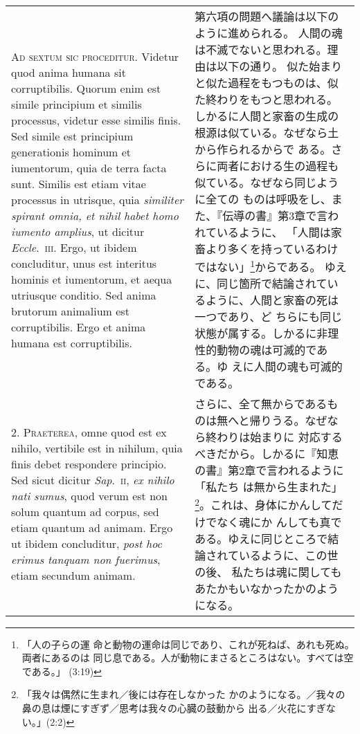 \documentclass[10pt]{jsarticle} %
\begin{document}
\begin{longtable}{p{21em}p{21em}}

{\scshape Ad sextum sic proceditur}. Videtur quod anima humana sit
corruptibilis. Quorum enim est simile principium et similis processus,
videtur esse similis finis. Sed simile est principium generationis
hominum et iumentorum, quia de terra facta sunt. Similis est etiam
vitae processus in utrisque, quia {\itshape similiter spirant omnia, et nihil
habet homo iumento amplius}, ut dicitur {\itshape Eccle}.~{\scshape iii}. Ergo, ut ibidem
concluditur, unus est interitus hominis et iumentorum, et aequa
utriusque conditio. Sed anima brutorum animalium est
corruptibilis. Ergo et anima humana est corruptibilis.


&

第六項の問題へ議論は以下のように進められる。
人間の魂は不滅でないと思われる。理由は以下の通り。
似た始まりと似た過程をもつものは、似た終わりをもつと思われる。
しかるに人間と家畜の生成の根源は似ている。なぜなら土から作られるからで
 ある。さらに両者における生の過程も似ている。なぜなら同じように全ての
 ものは呼吸をし、また、『伝導の書』第3章で言われているように、
「人間は家畜より多くを持っているわけではない」\footnote{「人の子らの運
 命と動物の運命は同じであり、これが死ねば、あれも死ぬ。両者にあるのは
 同じ息である。人が動物にまさるところはない。すべては空である。」
 (3:19)}からである。
ゆえに、同じ箇所で結論されているように、人間と家畜の死は一つであり、ど
 ちらにも同じ状態が属する。しかるに非理性的動物の魂は可滅的である。ゆ
 えに人間の魂も可滅的である。


\\



2. {\scshape Praeterea}, omne quod est ex nihilo, vertibile est in nihilum, quia
finis debet respondere principio. Sed sicut dicitur {\itshape Sap}.~{\scshape ii}, {\itshape ex nihilo
nati sumus}, quod verum est non solum quantum ad corpus, sed etiam
quantum ad animam. Ergo ut ibidem concluditur, {\itshape post hoc erimus tanquam
non fuerimus}, etiam secundum animam.


&

さらに、全て無からであるものは無へと帰りうる。なぜなら終わりは始まりに
対応するべきだから。しかるに『知恵の書』第2章で言われるように「私たち
は無から生まれた」\footnote{「我々は偶然に生まれ／後には存在しなかった
かのようになる。／我々の鼻の息は煙にすぎず／思考は我々の心臓の鼓動から
出る／火花にすぎない。」(2:2)}。これは、身体にかんしてだけでなく魂にか
んしても真である。ゆえに同じところで結論されているように、この世の後、
私たちは魂に関してもあたかもいなかったかのようになる。



\end{longtable}
\end{document}
